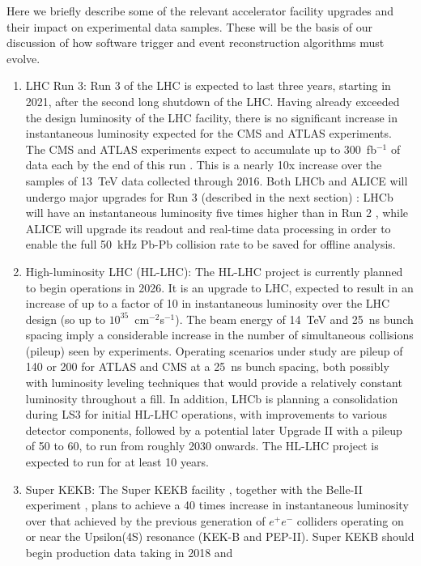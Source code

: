 Here we briefly describe some of the relevant accelerator facility upgrades and their impact on experimental data samples. These will be the basis of our discussion of how 
software trigger and event reconstruction algorithms must evolve.
\begin{enumerate}
\item 
LHC Run 3: Run 3 of the LHC is expected to last three years, starting in 2021, after the second long shutdown of the LHC. Having already exceeded the design luminosity of the 
LHC facility, there is no significant increase in instantaneous luminosity expected for the CMS and ATLAS experiments. The CMS and ATLAS experiments expect to accumulate up to 
300~fb$^{-1}$ of data each by the end of this run \cite{Bordry2016}. This is a nearly 10x increase over the samples of 13~TeV data collected through 2016. Both LHCb and ALICE will undergo 
major upgrades for Run 3 (described in the next section) : LHCb will have an instantaneous luminosity five times higher than in Run 2 \cite{LHCb2012}, while ALICE will 
upgrade \cite{ALICE2013} its readout and real-time data processing in order to enable the full 50~kHz Pb-Pb collision rate to be saved for offline analysis.
\item
High-luminosity LHC (HL-LHC): The HL-LHC project \cite{Zimmerman2009} is currently planned to begin operations in 2026. It is an upgrade to LHC, expected to result in an increase of up 
to a factor of 10 in instantaneous luminosity over the LHC design (so up to $10^{35}$~cm$^{-2}$s$^{-1}$). The beam energy of 14~TeV and 25~ns bunch spacing imply a considerable increase in the 
number of simultaneous collisions (pileup) seen by experiments. Operating scenarios under study are pileup of 140 or 200 for ATLAS \cite{ATLAS2015} and CMS \cite{CMS2015} at a 25~ns bunch 
spacing, both possibly with luminosity leveling techniques that would provide a relatively constant luminosity throughout a fill. In addition, LHCb \cite{LHCb2017} is planning a 
consolidation during LS3 for initial HL-LHC operations, with improvements to various detector components, followed by a potential later Upgrade II with a pileup of 50 to 60, to 
run from roughly 2030 onwards. The HL-LHC project is expected to run for at least 10 years. 
\item
Super KEKB: The Super KEKB facility \cite{Ohnishi2013}, together with the Belle-II experiment \cite{BelleII2010}, plans to achieve a 40 times increase in instantaneous luminosity over that 
achieved by the previous generation of $e^+e^-$ colliders operating on or near the Upsilon(4S) resonance (KEK-B and PEP-II). Super KEKB should begin production data taking in 2018 and 

\end{enumerate}
